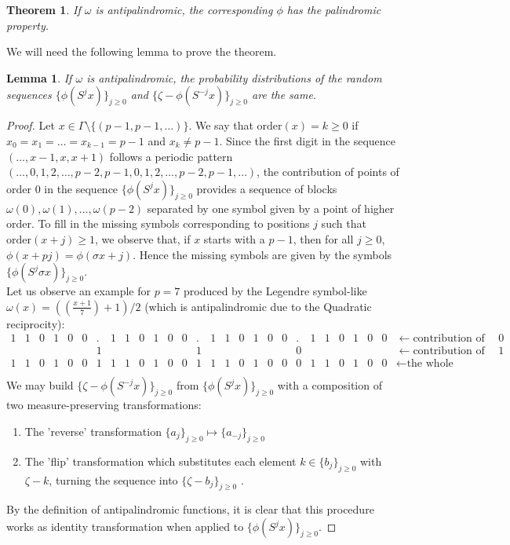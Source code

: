 \documentclass[a4paper]{article}
\theoremstyle{plain}
\newtheorem{theorem}{Theorem}[section]
\newtheorem{lemma}{Lemma}[section]
\theoremstyle{definition}
\begin{document}
\begin{theorem}
If $\omega$ is antipalindromic, the corresponding $\phi$ has the palindromic property.
\end{theorem}

We will need the following lemma to prove the theorem.

\begin{lemma}  \label{distLemma}
If $\omega$ is antipalindromic, the probability distributions of the random sequences $\{\phi(S^j x)\}_{j \ge 0}$ and $\{ \zeta - \phi(S^{-j} x)\}_{j \ge 0}$ are the same.
\end{lemma}
\begin{proof}
Let $x \in \Gamma \setminus \{(p-1,p-1,\ldots)\}$. We
say that $\mathrm{order}(x) = k \ge 0$ if $x_0=x_1=\ldots=x_{k-1}=p-1$ and $x_k \ne p-1$.
Since the first digit in the sequence $(\ldots, x-1,x,x+1)$ follows a periodic pattern
$(\ldots, 0, 1, 2, \ldots,p-2, p-1, 0, 1, 2, \ldots,p-2, p-1, \ldots)$, the contribution of points of order $0$ in the sequence
$\{\phi(S^j x)\}_{j \ge 0}$ provides a sequence of blocks $\omega(0),\omega(1),\ldots, \omega(p-2)$ separated by one symbol
given by a point of higher order. To fill in the missing symbols corresponding to positions $j$ 
such that $\mathrm{order}(x+j) \ge 1$, we observe that, if $x$ starts with a $p-1$, then for all $j \ge 0$, $\phi(x+pj)=\phi(\sigma x + j)$. Hence the missing symbols are given by the symbols $\{\phi(S^j \sigma x)\}_{j \ge 0}$.\\
Let us observe an example for $p=7$ produced by the Legendre symbol-like $\omega(x)=((\frac{x+1}{7}) + 1)/2$ (which is antipalindromic due to the Quadratic reciprocity):\bigskip\\
$\begin{array}{cccccccccccccccccccccccccccl}
1 & 1 & 0 & 1 & 0 & 0 & . & 1 & 1 & 0 & 1 & 0 & 0 &. & 1 & 1 & 0 & 1 & 0 & 0 & . & 1 & 1 & 0 & 1 & 0 & 0 &\leftarrow \text{contribution of order }0 \\
  &   &   &   &   &   & 1 &   &   &   &   &   &   &1 &   &   &   &   &   &   & 0 &   &   &   &   &   &   &\leftarrow \text{contribution of order }1 \\
1 & 1 & 0 & 1 & 0 & 0 & 1 & 1 & 1 & 0 & 1 & 0 & 0 & 1 & 1 & 1 & 0 & 1 & 0 & 0 & 0 & 1 & 1 & 0 & 1 & 0 & 0 &\leftarrow \text{the whole sequence} \\
\end{array}$
\bigskip\\
We may build $\{ \zeta - \phi(S^{-j} x)\}_{j \ge 0}$ from $\{\phi(S^j x)\}_{j \ge 0}$ with a composition of two measure-preserving transformations:
\begin{enumerate}
\item The 'reverse' transformation  $\{a_j\}_{j \ge 0} \mapsto \{a_{-j}\}_{j \ge 0}$ 
\item The 'flip' transformation which substitutes each element $k \in \{b_j\}_{j \ge 0}$ with $\zeta-k$, turning the sequence into $\{ \zeta - b_j\}_{j \ge 0}$ .
\end{enumerate}
By the definition of antipalindromic functions, it is clear that this procedure works as identity transformation when applied to $\{\phi(S^j x)\}_{j \ge 0}$.
\end{proof}
\end{document}
